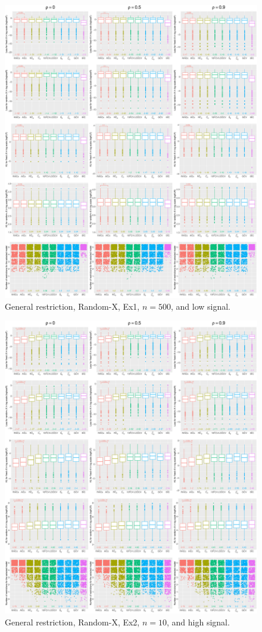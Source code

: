 \begin{figure}[!ht]
\centering
\includegraphics[width=\textwidth]{figures/supplement/randomx/general_restriction/Ex1_n500_lsnr.eps}
\caption{General restriction, Random-X, Ex1, $n=500$, and low signal.}
\end{figure}
\clearpage
\begin{figure}[!ht]
\centering
\includegraphics[width=\textwidth]{figures/supplement/randomx/general_restriction/Ex2_n10_hsnr.eps}
\caption{General restriction, Random-X, Ex2, $n=10$, and high signal.}
\end{figure}
